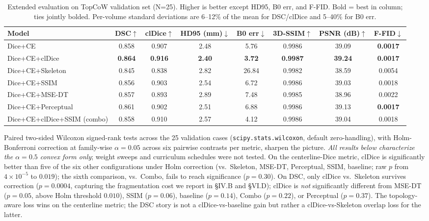 \documentclass[conference]{IEEEtran}
\begin{document}
\begin{table}[t]
\centering
\caption{Extended evaluation on TopCoW validation set (N=25). Higher is better except HD95, B0 err, and F-FID. Bold = best in column; ties jointly bolded. Per-volume standard deviations are 6--12\% of the mean for DSC/clDice and 5--40\% for B0 err.}
\label{tab:extended}
\begin{tabular}{lccccccc}
\toprule
\textbf{Model} & \textbf{DSC}$\uparrow$ & \textbf{clDice}$\uparrow$ & \textbf{HD95 (mm)}$\downarrow$ & \textbf{B0 err}$\downarrow$ & \textbf{3D-SSIM}$\uparrow$ & \textbf{PSNR (dB)}$\uparrow$ & \textbf{F-FID}$\downarrow$ \\
\midrule
Dice+CE                       & 0.858 & 0.907 & 2.48 & 5.76  & 0.9986 & 39.09 & \textbf{0.0017} \\
Dice+CE+clDice                & \textbf{0.864} & \textbf{0.916} & \textbf{2.40} & \textbf{3.72}  & \textbf{0.9987} & \textbf{39.24} & \textbf{0.0017} \\
Dice+CE+Skeleton              & 0.845 & 0.838 & 2.82 & 26.84 & 0.9982 & 38.59 & 0.0054 \\
Dice+CE+SSIM                  & 0.856 & 0.903 & 2.54 & 6.72  & 0.9986 & 39.03 & 0.0018 \\
Dice+CE+MSE-DT                & 0.857 & 0.893 & 2.89 & 7.48  & 0.9985 & 38.96 & 0.0022 \\
Dice+CE+Perceptual            & 0.861 & 0.902 & 2.51 & 6.88  & 0.9986 & 39.13 & \textbf{0.0017} \\
Dice+CE+clDice+SSIM (combo)   & 0.858 & 0.910 & 2.57 & 4.12  & 0.9986 & 39.04 & 0.0018 \\
\bottomrule
\end{tabular}
\end{table}

Paired two-sided Wilcoxon signed-rank tests across the 25 validation cases (\texttt{scipy.stats.wilcoxon}, default zero-handling), with Holm-Bonferroni correction at family-wise $\alpha{=}0.05$ across six pairwise contrasts per metric, sharpen the picture. \emph{All results below characterize the $\alpha{=}0.5$ convex form only}; weight sweeps and curriculum schedules were not tested. On the centerline-Dice metric, clDice is significantly better than five of the six other configurations under Holm correction (vs.\ Skeleton, MSE-DT, Perceptual, SSIM, baseline; raw $p$ from $4{\times}10^{-5}$ to $0.019$); the sixth comparison, vs.\ Combo, fails to reach significance ($p{=}0.30$). On DSC, only clDice vs.\ Skeleton survives correction ($p{=}0.0004$, capturing the fragmentation cost we report in §IV.B and §VI.D); clDice is \emph{not} significantly different from MSE-DT ($p{=}0.05$, above Holm threshold $0.010$), SSIM ($p{=}0.06$), baseline ($p{=}0.14$), Combo ($p{=}0.22$), or Perceptual ($p{=}0.37$). The topology-aware loss wins on the centerline metric; the DSC story is not a clDice-vs-baseline gain but rather a clDice-vs-Skeleton overlap loss for the latter.
\end{document}
